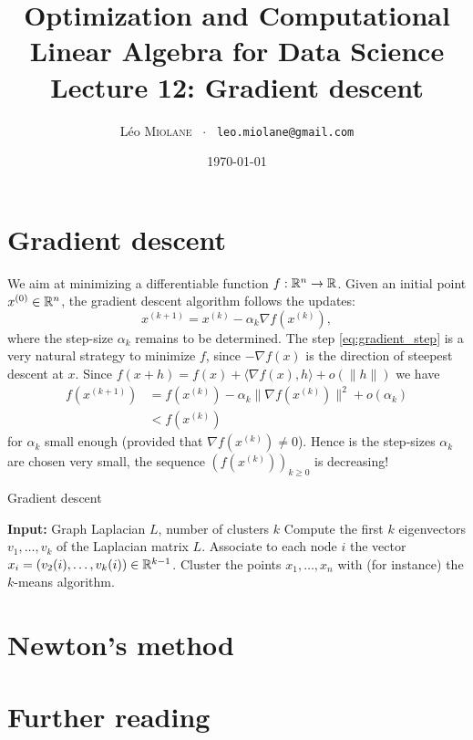 \documentclass[11pt,nocut]{article}
\title{\vspace{-2.0cm}%
	Optimization and Computational Linear Algebra for Data Science\\
Lecture 12: Gradient descent}
\author{Léo \textsc{Miolane} \ $\cdot$ \ \texttt{leo.miolane@gmail.com}}
\date{\today}
\begin{document}
\maketitle


\section{Gradient descent}

We aim at minimizing a differentiable function $f: \mathbb{R}^n \to \mathbb{R}$.
Given an initial point $x^{(0)} \in \mathbb{R}^n$, the gradient descent algorithm follows the updates:
\begin{equation}\label{eq:gradient_step}
x^{(k+1)} = x^{(k)} - \alpha_k \nabla f(x^{(k)}),
\end{equation}
where the step-size $\alpha_k$ remains to be determined.
The step \eqref{eq:gradient_step} is a very natural strategy to minimize $f$, since $-\nabla f(x)$ is the direction of steepest descent at $x$. Since $f(x+h) = f(x) + \langle \nabla f(x), h \rangle + o(\|h\|)$ we have
\begin{align*}
f(x^{(k+1)}) 
&= f(x^{(k)}) - \alpha_k \| \nabla f(x^{(k)}) \|^2 + o(\alpha_k) \\
&< f(x^{(k)}) 
\end{align*}
for $\alpha_k$ small enough (provided that $\nabla f(x^{(k)}) \neq 0$).
Hence is the step-sizes $\alpha_k$ are chosen very small, the sequence $(f(x^{(k)}))_{k \geq 0}$ is decreasing!


\begin{algorithm}
\caption{Gradient descent}
\begin{algorithmic}[1]
	\Statex \textbf{Input:} Graph Laplacian $L$, number of clusters $k$
	\State Compute the first $k$ eigenvectors $v_1, \dots, v_k$ of the Laplacian matrix $L$.
	\State Associate to each node $i$ the vector $x_i = (v_2(i), \dots, v_k(i)) \in \mathbb{R}^{k-1}$.
	\State Cluster the points $x_1, \dots, x_n$ with (for instance) the $k$-means algorithm.
\end{algorithmic}
\end{algorithm}

\section{Newton's method}


\section*{Further reading}


\vspace{1cm}
\centerline{}




\end{document}
